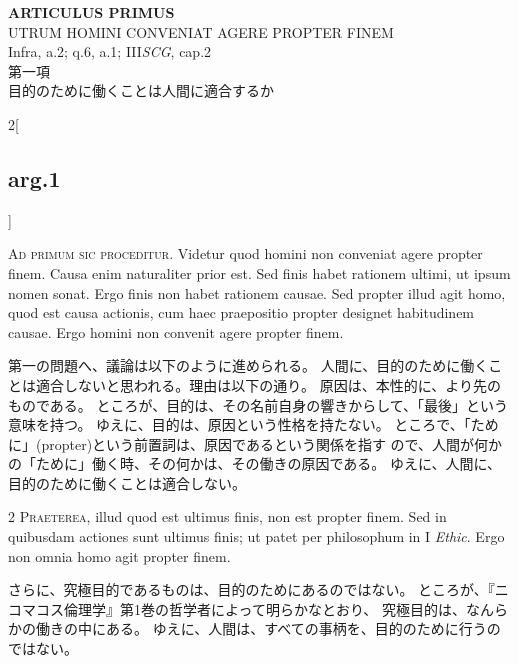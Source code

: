 \documentclass[paper=a4paper,fontsize=10pt,jafontsize=9pt,titlepage]{jlreq}
\begin{document}
\newpage
{}
{}
\setcounter{section}{1}
\setcounter{subsection}{0}
\begin{center}
 {\Large {\bfseries ARTICULUS PRIMUS}}\\
 {\large UTRUM HOMINI CONVENIAT AGERE PROPTER FINEM}\\
 {\footnotesize Infra, a.2; q.6, a.1; III{\itshape SCG}, cap.2}\\
 {\Large 第一項\\目的のために働くことは人間に適合するか}
\end{center}

\begin{paracol}{2}[\subsection{arg.1}]

{\Huge A}{\scshape d primum sic proceditur}. Videtur quod
homini non conveniat agere propter finem. Causa enim naturaliter prior
est. Sed finis habet rationem ultimi, ut ipsum nomen sonat. Ergo finis
non habet rationem causae. Sed propter illud agit homo, quod est causa
actionis, cum haec praepositio propter designet habitudinem causae. Ergo
homini non convenit agere propter finem.

\switchcolumn

第一の問題へ、議論は以下のように進められる。
人間に、目的のために働くことは適合しないと思われる。理由は以下の通り。
原因は、本性的に、より先のものである。
ところが、目的は、その名前自身の響きからして、「最後」という意味を持つ。
ゆえに、目的は、原因という性格を持たない。
ところで、「ために」(propter)という前置詞は、原因であるという関係を指す
 ので、人間が何かの「ために」働く時、その何かは、その働きの原因である。
ゆえに、人間に、目的のために働くことは適合しない。


{\scshape 2 Praeterea}, illud quod est ultimus
finis, non est propter finem. Sed in quibusdam actiones sunt ultimus
finis; ut patet per philosophum in I {\itshape Ethic}. Ergo non omnia homo agit
propter finem.

\switchcolumn

さらに、究極目的であるものは、目的のためにあるのではない。
ところが、『ニコマコス倫理学』第1巻の哲学者によって明らかなとおり、
究極目的は、なんらかの働きの中にある。
ゆえに、人間は、すべての事柄を、目的のために行うのではない。


\end{paracol}
\end{document}
